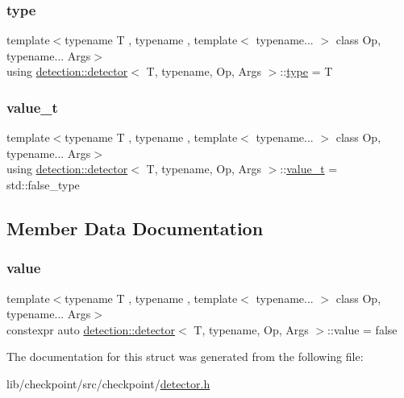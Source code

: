 \mbox{\label{structdetection_1_1detector_a5045a7b616b1dddb663ab56abd3504f0}} 
\subsubsection{\texorpdfstring{type}{type}}
{\footnotesize\ttfamily template$<$typename T , typename , template$<$ typename... $>$ class Op, typename... Args$>$ \\
using \hyperlink{structdetection_1_1detector}{detection\+::detector}$<$ T, typename, Op, Args $>$\+::\hyperlink{structdetection_1_1detector_a5045a7b616b1dddb663ab56abd3504f0}{type} =  T}

\mbox{\label{structdetection_1_1detector_af1f7df0c48576571b02511a65673b5a8}} 
\subsubsection{\texorpdfstring{value\+\_\+t}{value\_t}}
{\footnotesize\ttfamily template$<$typename T , typename , template$<$ typename... $>$ class Op, typename... Args$>$ \\
using \hyperlink{structdetection_1_1detector}{detection\+::detector}$<$ T, typename, Op, Args $>$\+::\hyperlink{structdetection_1_1detector_af1f7df0c48576571b02511a65673b5a8}{value\+\_\+t} =  std\+::false\+\_\+type}



\subsection{Member Data Documentation}
\mbox{\label{structdetection_1_1detector_a6d7d0e1bdf5903db9edbe448edccf83b}} 
\subsubsection{\texorpdfstring{value}{value}}
{\footnotesize\ttfamily template$<$typename T , typename , template$<$ typename... $>$ class Op, typename... Args$>$ \\
constexpr auto \hyperlink{structdetection_1_1detector}{detection\+::detector}$<$ T, typename, Op, Args $>$\+::value = false\hspace{0.3cm}{\ttfamily [static]}}



The documentation for this struct was generated from the following file\+:\begin{DoxyCompactItemize}
\item 
lib/checkpoint/src/checkpoint/\hyperlink{detector_8h}{detector.\+h}\end{DoxyCompactItemize}
